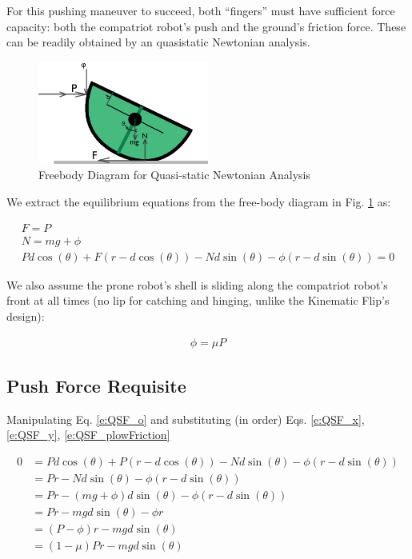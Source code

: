 \documentclass[letterpaper]{report}
\begin{document}
For this pushing maneuver to succeed, both ``fingers'' must have sufficient force capacity: both the compatriot robot's push and the ground's friction force.
These can be readily obtained by an quasistatic Newtonian analysis.

\begin{figure}[ht]
\centering
\includegraphics[width=0.5\textwidth]{QS_FreeBodyDiagram2.eps}
\caption{\label{f:QS_FBD}Freebody Diagram for Quasi-static Newtonian Analysis}
\end{figure}

We extract the equilibrium equations from the free-body diagram in Fig. \ref{f:QS_FBD} as:

\begin{align}
  F = P \label{e:QSF_x} \\
  N = mg + \phi \label{e:QSF_y} \\
  P d \cos(\theta) + F(r - d \cos(\theta)) - N d \sin(\theta) - \phi (r - d \sin(\theta)) = 0 \label{e:QSF_o}
\end{align}

We also assume the prone robot's shell is sliding along the compatriot robot's front at all times (no lip for catching and hinging, unlike the Kinematic Flip's design):

\begin{align}
  \phi = \mu P \label{e:QSF_plowFriction}
\end{align}

\subsection{Push Force Requisite}
Manipulating Eq. \ref{e:QSF_o} and substituting (in order) Eqs. \ref{e:QSF_x}, \ref{e:QSF_y}, \ref{e:QSF_plowFriction}

\begin{align}
  0 &= P d \cos(\theta) + P(r - d \cos(\theta)) - N d \sin(\theta) - \phi (r - d \sin(\theta))
  \\&= Pr - N d \sin(\theta) - \phi (r - d \sin(\theta))
  \\&= Pr - (mg + \phi) d \sin(\theta) - \phi (r - d \sin(\theta))
  \\&= Pr - mg d \sin(\theta) - \phi r
  \\&= (P - \phi)r - mg d \sin(\theta)
  \\&= (1-\mu) P r - mg d \sin(\theta)
\end{align}
\end{document}
